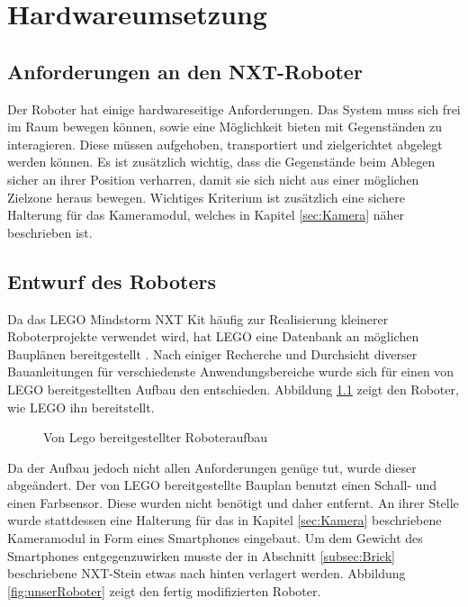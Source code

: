 \chapter{Hardwareumsetzung}
\label{cha:robot}
\section{Anforderungen an den NXT-Roboter}

Der Roboter hat einige hardwareseitige Anforderungen. Das System muss sich frei im Raum bewegen können, sowie eine Möglichkeit bieten mit Gegenständen zu interagieren. Diese müssen aufgehoben, transportiert und zielgerichtet abgelegt werden können. Es ist zusätzlich wichtig, dass die Gegenstände beim Ablegen sicher an ihrer Position verharren, damit sie sich nicht aus einer möglichen Zielzone heraus bewegen. Wichtiges Kriterium ist zusätzlich eine sichere Halterung für das Kameramodul, welches in Kapitel \ref{sec:Kamera} näher beschrieben ist.

\section{Entwurf des Roboters}

Da das LEGO Mindstorm NXT Kit häufig zur Realisierung kleinerer Roboterprojekte verwendet wird, hat LEGO eine Datenbank an möglichen Bauplänen bereitgestellt \cite{building_instructions}. Nach einiger Recherche und Durchsicht diverser Bauanleitungen für verschiedenste Anwendungsbereiche wurde sich für einen von LEGO bereitgestellten Aufbau den entschieden. Abbildung \ref{fig:standardRoboter} zeigt den Roboter, wie LEGO ihn bereitstellt.

\begin{figure}[h]
\centering
{}
\caption{Von Lego bereitgestellter Roboteraufbau}
\label{fig:standardRoboter}
\end{figure}


Da der Aufbau jedoch nicht allen Anforderungen genüge tut, wurde dieser abgeändert. Der von LEGO bereitgestellte Bauplan benutzt einen Schall- und einen Farbsensor. Diese wurden nicht benötigt und daher entfernt. An ihrer Stelle wurde stattdessen eine Halterung für das in Kapitel \ref{sec:Kamera} beschriebene Kameramodul in Form eines Smartphones eingebaut. Um dem Gewicht des Smartphones entgegenzuwirken musste der in Abschnitt \ref{subsec:Brick} beschriebene NXT-Stein etwas nach hinten verlagert werden. Abbildung \ref{fig:unserRoboter} zeigt den fertig modifizierten Roboter.

